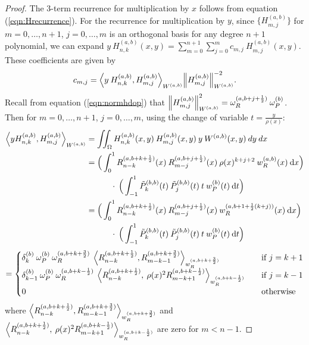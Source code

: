 \documentclass[11pt, oneside]{article}   	%
\newcommand{\half}{\frac{1}{2}}
\newcommand{\hdop}{H}
\newcommand{\hdopnkab}{\hdop_{n,k}^{(a,b)}}
\newcommand{\Wab}{{W^{(a,b)}}}
\newcommand{\hdopmjab}{\hdop_{m,j}^{(a,b)}}
\newcommand{\jac}{{\tilde P}}
\newcommand{\genjac}{R}
\newcommand{\genjacnmk}{\genjac_{n-k}}
\newcommand{\genjacmmj}{\genjac_{m-j}}
\newcommand{\genjacw}{w_\genjac}
\newcommand{\jacw}{w_P}
\newcommand{\normgenjac}{\omega_\genjac}
\newcommand{\normjac}{\omega_P}
\begin{document}
\begin{proof}
The 3-term recurrence for multiplication by $x$ follows from equation (\ref{eqn:Hrecurrence}). For the recurrence for multiplication by $y$, since $\{\hdopmjab\}$ for $m = 0,\dots,n+1$, $j = 0,\dots,m$ is an orthogonal basis for any degree $n+1$ polynomial, we can expand $y \: \hdopnkab(x,y) = \sum_{m=0}^{n+1} \sum_{j=0}^m c_{m,j} \: \hdopmjab(x,y)$. These coefficients are given by
\begin{align*}
	c_{m,j} = {\ip< y \: \hdopnkab, \hdopmjab >_{\Wab}}{\norm{\hdopmjab}^{-2}_{\Wab}}.
\end{align*}
Recall from equation (\ref{eqn:normhdop}) that $\norm{\hdopmjab}_{\Wab}^2 = \normgenjac^{(a,b+j+\half)} \: \normjac^{(b)}$. Then for $m = 0,\dots,n+1$, $j = 0,\dots,m$, using the change of variable $t = \frac{y}{\rho(x)}$:
\begin{align*}
	\ip<y \hdopnkab, \hdopmjab>_\Wab &=  \iint_\Omega \hdopnkab(x,y) \: \hdopmjab(x,y) \: y \: \Wab(x,y) \: dy \: dx \\
	&= \Big( \int^1_0 \genjacnmk^{(a, b+k+\half)}(x) \: \genjacmmj^{(a, b+j+\half)}(x) \: \rho(x)^{k+j+2} \: \genjacw^{(a, b)}(x) \: \D x \Big) \nonumber \\
	& \quad \quad \quad\cdot \: \Big( \int^1_{-1} \jac_k^{(b,b)}(t) \: \jac_j^{(b,b)}(t) \: t \: \jacw^{(b)}(t) \: \D t \Big) \\
	&= \Big( \int^1_0 \genjacnmk^{(a, b+k+\half)}(x) \: \genjacmmj^{(a, b+j+\half)}(x) \: \genjacw^{(a, b+1+\half(k+j))}(x) \: \D x \Big) \nonumber \\
	& \quad \quad \quad\cdot \: \Big( \int^1_{-1} \jac_k^{(b,b)}(t) \: \jac_j^{(b,b)}(t) \: t \: \jacw^{(b)}(t) \: \D t \Big)
\end{align*}
\begin{align*}
	=
	\begin{cases}
    		\delta_k^{(b)} \: \normjac^{(b)} \: \normgenjac^{(a,b+k+\frac{3}{2})} \: \ip<\genjacnmk^{(a, b+k+\half)}, \genjac_{m-k-1}^{(a, b+k+\frac{3}{2})}>_{\genjacw^{(a, b+k+\frac{3}{2})}} \quad& \text{if } j = k+1 \\
		\delta_{k-1}^{(b)} \: \normjac^{(b)} \: \normgenjac^{(a,b+k-\half)} \: \ip<\genjacnmk^{(a, b+k+\half)}, \: \rho(x)^2 \genjac_{m-k+1}^{(a, b+k-\half)}>_{\genjacw^{(a, b+k-\half)}} \quad& \text{if } j = k-1 \\
		0 & \text{otherwise}
      	\end{cases}
\end{align*}
where $\ip<\genjacnmk^{(a, b+k+\half)}, \genjac_{m-k-1}^{(a, b+k+\frac{3}{2})}>_{\genjacw^{(a, b+k+\frac{3}{2})}}$ and $\ip<\genjacnmk^{(a, b+k+\half)}, \: \rho(x)^2 \genjac_{m-k+1}^{(a, b+k-\half)}>_{\genjacw^{(a, b+k-\half)}}$ are zero for $m < n-1$.

\end{proof}
\end{document}
